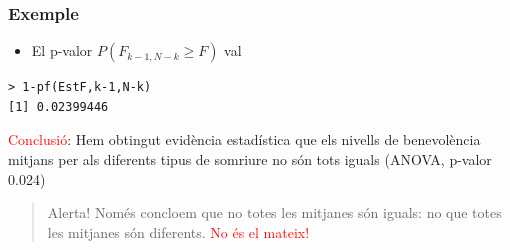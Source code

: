 \documentclass[12pt,t]{beamer}
\newcommand{\red}[1]{\textcolor{red}{#1}}
\renewcommand{\emph}[1]{{\color{red}#1}}
\renewcommand{\geq}{\geqslant}
\theoremstyle{plain}
\theoremstyle{definition}
\begin{document}
\begin{frame}[fragile]
\frametitle{Exemple}\vspace*{-2ex}


\begin{itemize}
\item El p-valor  $P(F_{k-1,N-k}\geq F)$ val
\end{itemize}
\begin{lstlisting}
> 1-pf(EstF,k-1,N-k)
[1] 0.02399446
\end{lstlisting}
\pause\medskip

\red{Conclusió}: Hem obtingut evidència estadística que els nivells de benevolència mitjans per als diferents tipus de somriure no són tots iguals (ANOVA, p-valor 0.024)\pause\bigskip

\begin{quote}
\emph{Alerta!} Només concloem que no totes les mitjanes són iguals: no que totes les mitjanes són diferents. \red{No és el mateix!}
\end{quote}
\end{frame}
\end{document}

